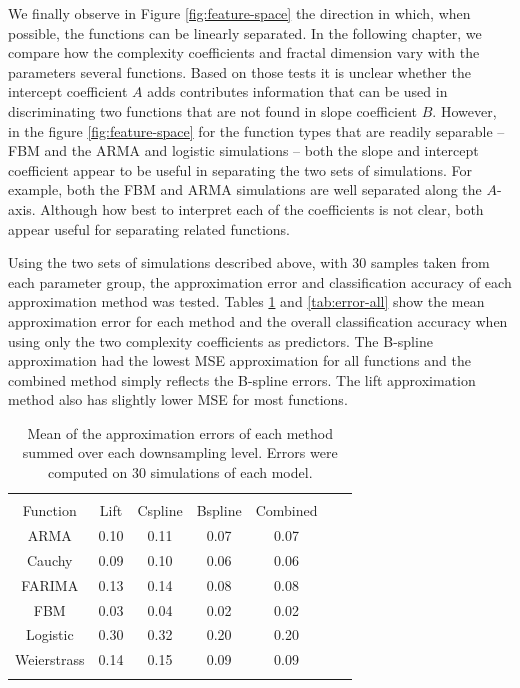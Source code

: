We finally observe in Figure \ref{fig:feature-space} the direction in which, when possible, the functions can be linearly separated.
 In the following chapter, we compare how the complexity coefficients and fractal dimension vary with the parameters several functions. 
 Based on those tests it is unclear whether the intercept coefficient $A$ adds contributes information that can be used in discriminating two functions that are not found in slope coefficient $B$.
 However, in the figure \ref{fig:feature-space} for the function types that are readily separable -- FBM and the ARMA and logistic simulations --  both the slope and intercept coefficient appear to be useful in separating the two sets of simulations. For example, both the FBM and ARMA simulations are well separated along the $A$-axis. Although how best to interpret each of the coefficients is not clear, both appear useful for separating related functions.

Using the two sets of simulations described above, with 30 samples taken from each parameter group, the approximation error and classification accuracy of each approximation method was tested. 
Tables \ref{tab:epsilons-all} and \ref{tab:error-all} show the mean approximation error for each method and the overall classification accuracy when using only the two complexity coefficients as predictors. The B-spline approximation had the lowest MSE approximation for all functions
and the combined method simply reflects the B-spline errors. 
The lift approximation method also has slightly lower
MSE for most functions. 


\begin{table}[!htbp] \centering 
\begin{tabular}{@{\extracolsep{1pt}} ccccccc} 
\\[-1.8ex]\hline 
\hline \\[-1.8ex] 
  Function & Lift & Cspline & Bspline & Combined \\ \hline 
ARMA       & 0.10  & 0.11    & 0.07 & 0.07 \\ 
Cauchy       & 0.09  & 0.10  & 0.06 & 0.06 \\ 
FARIMA       & 0.13  & 0.14  & 0.08 & 0.08 \\ 
FBM          & 0.03  & 0.04  & 0.02 & 0.02 \\ 
Logistic     & 0.30  & 0.32  & 0.20 & 0.20 \\ 
Weierstrass  & 0.14  & 0.15  & 0.09 & 0.09 \\ 
\hline \\[-1.8ex] 
          \end{tabular} 
  \caption{Mean of the approximation errors of each method 
         summed over each downsampling level. 
           Errors were computed on 30 simulations of each model. 
             }
  \label{tab:epsilons-all}
\end{table}



